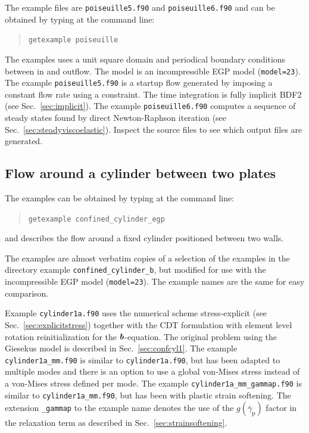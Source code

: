 The example files are \texttt{poiseuille5.f90} and \texttt{poiseuille6.f90} and can
be obtained by typing at the
command line:
\begin{quote}
   \texttt{getexample poiseuille}
\end{quote}
The examples uses a unit square domain and
periodical boundary conditions between in and outflow.
The model is an incompressible EGP model (\texttt{model=23}).
The example \texttt{poiseuille5.f90} is a startup flow generated by imposing a constant flow rate using a constraint.
The time integration is fully implicit BDF2 (see Sec.~\ref{sec:implicit}).
The example \texttt{poiseuille6.f90} computes a sequence of steady states found by direct Newton-Raphson iteration (see Sec.~\ref{sec:steadyviscoelastic}).
Inspect the source files to see which output files are generated.

\subsection{Flow around a cylinder between two plates}

The examples can be obtained by typing at the command line:
\begin{quote}
   \texttt{getexample confined\_cylinder\_egp}
\end{quote}
and describes the flow
around a fixed cylinder positioned between two walls.

The examples are almost verbatim copies of a selection of the examples in the directory example \texttt{confined\_cylinder\_b}, but modified for use with the incompressible EGP model (\texttt{model=23}). The example names are the same for easy comparison.

Example \texttt{cylinder1a.f90} uses the numerical scheme
stress-explicit (see Sec.~\ref{sec:explicitstress}) together with the CDT formulation with element level rotation reinitialization for the $\boldsymbol{b}$-equation. The original problem using the Giesekus model is described in Sec.~\ref{sec:confcyl1}. The example \texttt{cylinder1a\_mm.f90} is similar to \texttt{cylinder1a.f90}, but has been adapted to multiple modes and there is an option to use a global von-Mises stress instead of a von-Mises stress defined per mode. The example \texttt{cylinder1a\_mm\_gammap.f90} is similar to \texttt{cylinder1a\_mm.f90}, but has been with plastic strain softening. The extension \texttt{\_gammap} to the example name denotes the use of the $g(\bar\gamma_\text{p})$ factor in the relaxation term as described in Sec.~\ref{sec:strainsoftening}.

